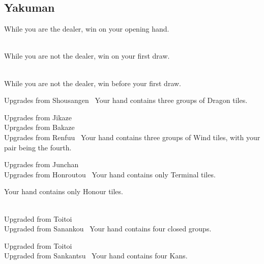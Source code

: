 \subsection{Yakuman}\label{core:ssec:yakuman-yaku}

	{\closedhand}
	{While you are the dealer, win on your opening hand.}

	{\closedhand \\
	\brokenhand}
	{While you are not the dealer, win on your first draw.}

	{\closedhand \\
	\brokenhand}
	{While you are not the dealer, win before your first draw.}

	{\upgradesfrom Upgrades from Shousangen~}
	{Your hand contains three groups of Dragon tiles.}

	{\upgradesfrom Upgrades from Jikaze~\\
	\upgradesfrom Uprgades from Bakaze~\\
	\upgradesfrom Upgrades from Renfuu~}
	{Your hand contains three groups of Wind tiles, with your pair being the fourth.}

	{\upgradesfrom Upgrades from Junchan~ \\
	\upgradesfrom Upgrades from Honroutou~}
	{Your hand contains only Terminal tiles.}

	{}
	{Your hand contains only Honour tiles.}

	{\closedhand\\
	\upgradesfrom Upgraded from Toitoi~ \\
	\upgradesfrom Upgraded from Sanankou~}
	{Your hand contains four closed groups.}

	{\upgradesfrom Upgraded from Toitoi~ \\
	\upgradesfrom Upgraded from Sankantsu~}
	{Your hand contains four Kans.}

